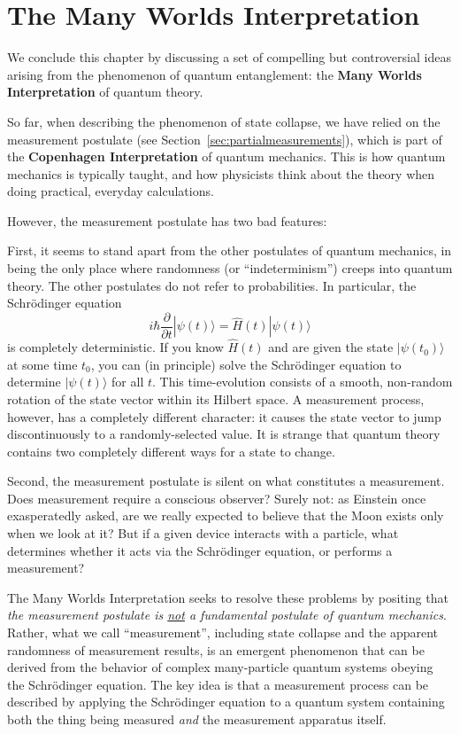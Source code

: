 \documentclass[pra,12pt]{revtex4}
\begin{document}
\section{The Many Worlds Interpretation}

We conclude this chapter by discussing a set of compelling but
controversial ideas arising from the phenomenon of quantum
entanglement: the \textbf{Many Worlds Interpretation} of quantum
theory.

So far, when describing the phenomenon of state collapse, we have
relied on the measurement postulate (see
Section~\ref{sec:partialmeasurements}), which is part of the
\textbf{Copenhagen Interpretation} of quantum mechanics.  This is how
quantum mechanics is typically taught, and how physicists think about
the theory when doing practical, everyday calculations.

However, the measurement postulate has two bad features:

First, it seems to stand apart from the other postulates of quantum
mechanics, in being the only place where randomness (or
``indeterminism'') creeps into quantum theory.  The other postulates
do not refer to probabilities.  In particular, the Schr\"odinger equation
\begin{equation}
  i\hbar\frac{\partial}{\partial t}|\psi(t)\rangle = \hat{H}(t) |\psi(t)\rangle
\end{equation}
is completely deterministic.  If you know $\hat{H}(t)$ and are given
the state $|\psi(t_0)\rangle$ at some time $t_0$, you can (in
principle) solve the Schr\"odinger equation to determine
$|\psi(t)\rangle$ for all $t$.  This time-evolution consists of a
smooth, non-random rotation of the state vector within its Hilbert
space.  A measurement process, however, has a completely different
character: it causes the state vector to jump discontinuously to a
randomly-selected value.  It is strange that quantum theory contains
two completely different ways for a state to change.

Second, the measurement postulate is silent on what constitutes a
measurement.  Does measurement require a conscious observer?  Surely
not: as Einstein once exasperatedly asked, are we really expected to
believe that the Moon exists only when we look at it?  But if a given
device interacts with a particle, what determines whether it acts via
the Schr\"odinger equation, or performs a measurement?

The Many Worlds Interpretation seeks to resolve these problems by
positing that \textit{the measurement postulate is \underline{not} a
  fundamental postulate of quantum mechanics}.  Rather, what we call
``measurement'', including state collapse and the apparent randomness
of measurement results, is an emergent phenomenon that can be derived
from the behavior of complex many-particle quantum systems obeying the
Schr\"odinger equation.  The key idea is that a measurement process
can be described by applying the Schr\"odinger equation to a quantum
system containing both the thing being measured \textit{and} the
measurement apparatus itself.
\end{document}
